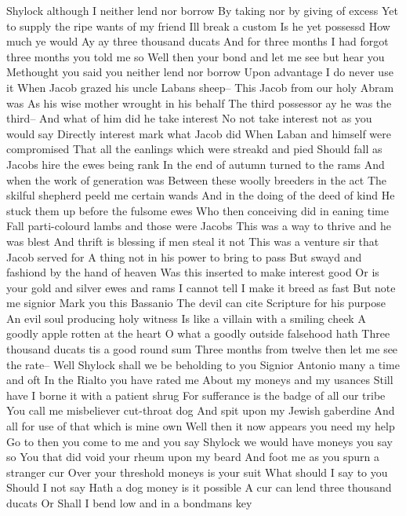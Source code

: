 Shylock although I neither lend nor borrow 
By taking nor by giving of excess 
Yet to supply the ripe wants of my friend 
Ill break a custom Is he yet possessd 
How much ye would 
Ay ay three thousand ducats 
And for three months 
I had forgot three months you told me so 
Well then your bond and let me see but hear you 
Methought you said you neither lend nor borrow 
Upon advantage 
I do never use it 
When Jacob grazed his uncle Labans sheep-- 
This Jacob from our holy Abram was 
As his wise mother wrought in his behalf 
The third possessor ay he was the third-- 
And what of him did he take interest 
No not take interest not as you would say 
Directly interest mark what Jacob did 
When Laban and himself were compromised 
That all the eanlings which were streakd and pied 
Should fall as Jacobs hire the ewes being rank 
In the end of autumn turned to the rams 
And when the work of generation was 
Between these woolly breeders in the act 
The skilful shepherd peeld me certain wands 
And in the doing of the deed of kind 
He stuck them up before the fulsome ewes 
Who then conceiving did in eaning time 
Fall parti-colourd lambs and those were Jacobs 
This was a way to thrive and he was blest 
And thrift is blessing if men steal it not 
This was a venture sir that Jacob served for 
A thing not in his power to bring to pass 
But swayd and fashiond by the hand of heaven 
Was this inserted to make interest good 
Or is your gold and silver ewes and rams 
I cannot tell I make it breed as fast 
But note me signior 
Mark you this Bassanio 
The devil can cite Scripture for his purpose 
An evil soul producing holy witness 
Is like a villain with a smiling cheek 
A goodly apple rotten at the heart 
O what a goodly outside falsehood hath 
Three thousand ducats tis a good round sum 
Three months from twelve then let me see the rate-- 
Well Shylock shall we be beholding to you 
Signior Antonio many a time and oft 
In the Rialto you have rated me 
About my moneys and my usances 
Still have I borne it with a patient shrug 
For sufferance is the badge of all our tribe 
You call me misbeliever cut-throat dog 
And spit upon my Jewish gaberdine 
And all for use of that which is mine own 
Well then it now appears you need my help 
Go to then you come to me and you say 
Shylock we would have moneys you say so 
You that did void your rheum upon my beard 
And foot me as you spurn a stranger cur 
Over your threshold moneys is your suit 
What should I say to you Should I not say 
Hath a dog money is it possible 
A cur can lend three thousand ducats Or 
Shall I bend low and in a bondmans key 
